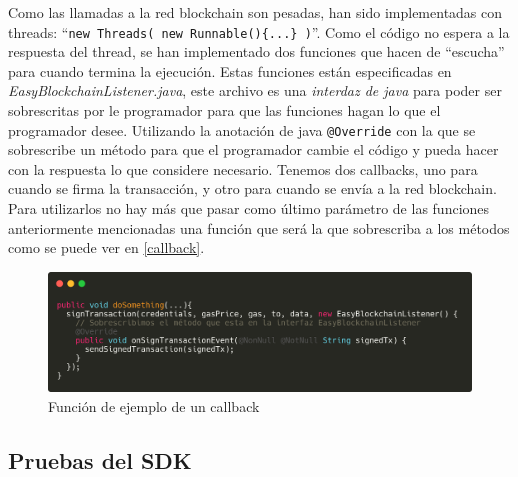 Como las llamadas a la red blockchain son pesadas, han sido implementadas con threads: ``\verb|new Threads( new Runnable(){...} )|''. Como el código no espera a la respuesta del thread, se han implementado dos funciones que hacen de ``escucha'' para cuando termina la ejecución. Estas funciones están especificadas en \emph{EasyBlockchainListener.java}, este archivo es una \emph{interdaz de java} para poder ser sobrescritas por le programador para que las funciones hagan lo que el programador desee. Utilizando la anotación de java \verb|@Override| con la que se sobrescribe un método para que el programador cambie el código y pueda hacer con la respuesta lo que considere necesario. Tenemos dos callbacks, uno para cuando se firma la transacción, y otro para cuando se envía a la red blockchain. Para utilizarlos no hay más que pasar como último parámetro de las funciones anteriormente mencionadas una función que será la que sobrescriba a los métodos como se puede ver en \ref{callback}.


\begin{figure}[h!]
  \centering
  \includegraphics[width=0.8\linewidth]{figs/Desarrollo/SDK/callback}
  \caption[Función de ejemplo de un callback]{Función de ejemplo de un callback}
  \label{fig:callback}
\end{figure}

\subsection{Pruebas del SDK}

